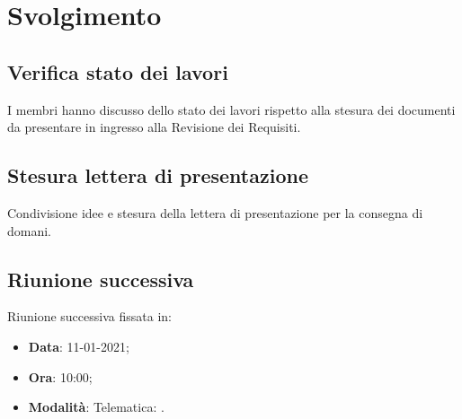 \documentclass[]{article}
\begin{document}
	\newpage

	\section{Svolgimento}
		\subsection{Verifica stato dei lavori}
		I membri hanno discusso dello stato dei lavori rispetto alla stesura dei documenti da presentare in ingresso alla Revisione dei Requisiti.
		
		\subsection{Stesura lettera di presentazione}
		Condivisione idee e stesura della lettera di presentazione per la consegna di domani.
		
		\subsection{Riunione successiva}
		Riunione successiva fissata in:
		\begin{itemize}
			\item \textbf{Data}: 11-01-2021;
			\item \textbf{Ora}: 10:00;
			\item \textbf{Modalità}: Telematica: .
		\end{itemize}
	
\end{document}
